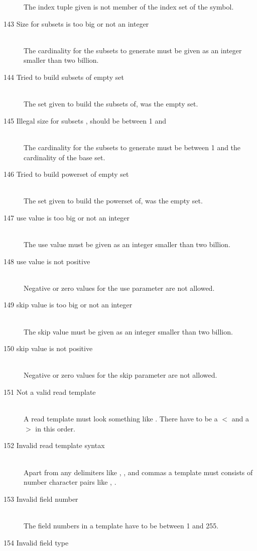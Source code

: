 \begin{description}
  The index tuple given is not member of the index set of the symbol.
\item[143 Size for subsets \code{xxx} is too big or not an integer]\ \\
  The cardinality for the subsets to generate must be given as an
  integer smaller than two billion.
\item[144 Tried to build subsets of empty set]\ \\
  The set given to build the subsets of, was the empty set.
\item[145 Illegal size for subsets \code{xxx}, should be between 1 
  and \code{yyy}]\ \\
  The cardinality for the subsets to generate must be between 1 
  and the cardinality of the base set.
\item[146 Tried to build powerset of empty set ]\ \\
  The set given to build the powerset of, was the empty set.
%
%
\item[147 use value \code{xxx} is too big or not an integer]\ \\
  The use value must be given as an integer smaller than two billion.
\item[148 use value \code{xxx} is not positive]\ \\
  Negative or zero values for the use parameter are not allowed.
\item[149 skip value \code{xxx} is too big or not an integer]\ \\
  The skip value must be given as an integer smaller than two billion.
\item[150 skip value \code{xxx} is not positive]\ \\
  Negative or zero values for the skip parameter are not allowed.
\item[151 Not a valid read template]\ \\
  A read template must look something like .
  There have to be a $<$ and a $>$ in this order.
\item[152 Invalid read template syntax]\ \\
  Apart from any delimiters like \code{$<$}, \code{$>$}, and commas a
  template must consists of number character pairs like , .
\item[153 Invalid field number \code{xxx}]\ \\
  The field numbers in a template have to be between 1 and 255.
\item[154 Invalid field type \code{xxx}]\ \\

\end{description}

